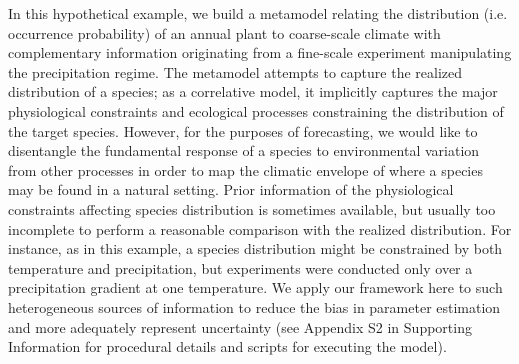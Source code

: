 \documentclass[11pt]{article}
\begin{document}
In this hypothetical example, we build a metamodel relating the distribution (i.e. occurrence probability) of an annual plant to coarse-scale climate with complementary information originating from a fine-scale experiment manipulating the precipitation regime.
The metamodel attempts to capture the realized distribution of a species; as a correlative model, it implicitly captures the major physiological constraints and ecological processes constraining the distribution of the target species. 
However, for the purposes of forecasting, we would like to disentangle the fundamental response of a species to environmental variation from other processes in order to map the climatic envelope of where a species may be found in a natural setting. 
Prior information of the physiological constraints affecting species distribution is sometimes available, but usually too incomplete to perform a reasonable comparison with the realized distribution.
For instance, as in this example, a species distribution might be constrained by both temperature and precipitation, but experiments were conducted only over a precipitation gradient at one temperature. 
We apply our framework here to such heterogeneous sources of information to reduce the bias in parameter estimation and more adequately represent uncertainty (see Appendix S2 in Supporting Information for procedural details and scripts for executing the model).
\end{document}

